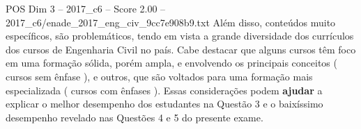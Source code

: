 \begin{textsample}{POS Dim 3 – 2017\_c6 – Score 2.00 – 2017\_c6/enade\_2017\_eng\_civ\_9cc7e908b9.txt}
Além disso, conteúdos muito específicos, são problemáticos, tendo em vista a grande diversidade dos currículos dos cursos de Engenharia Civil no país.
Cabe destacar que alguns cursos têm foco em uma formação sólida, porém ampla, e envolvendo os principais conceitos ( cursos sem ênfase ), e outros, que são voltados para uma formação mais especializada ( cursos com ênfases ).
Essas considerações podem \textbf{ajudar} a explicar o melhor desempenho dos estudantes na Questão 3 e o baixíssimo desempenho revelado nas Questões 4 e 5 do presente exame.

\end{textsample}
